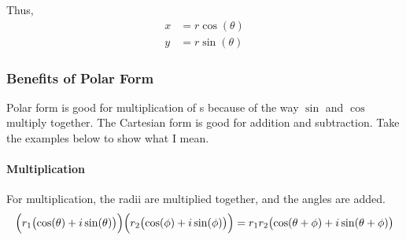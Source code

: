 Thus,
\begin{equation}\label{eq:Convert_Cartesian_Polar}
  \begin{aligned}
    x &= r \cos(\theta) \\
    y &= r \sin(\theta)
  \end{aligned}
\end{equation}

\subsubsection{Benefits of Polar Form}\label{subsubsec:Polar_Form_Benefits}
Polar form is good for multiplication of s because of the way $\sin$ and $\cos$ multiply together.
The Cartesian form is good for addition and subtraction.
Take the examples below to show what I mean.

\paragraph{Multiplication}\label{par:Polar_Form_Multiplication}
For multiplication, the radii are multiplied together, and the angles are added.
\begin{equation}\label{eq:Polar_Form_Muliplication}
  \Bigl( r_{1} \bigl( \cos(\theta) + i \sin(\theta) \bigr) \Bigr) \Bigl( r_{2} \bigl( \cos(\phi) + i \sin(\phi) \bigr) \Bigr) = r_{1}r_{2} \bigl( \cos(\theta + \phi) + i \sin(\theta + \phi) \bigr)
\end{equation}


